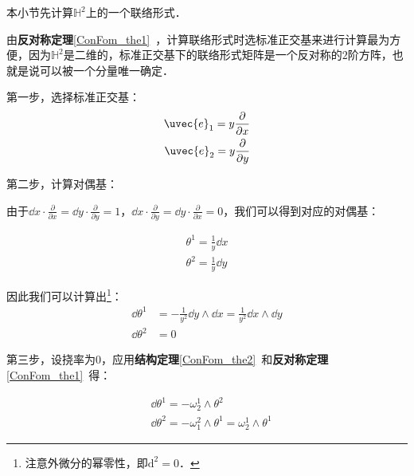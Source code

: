 
本小节先计算$\mathbb{H}^2$上的一个联络形式．

由\textbf{反对称定理}\autoref{ConFom_the1}~，计算联络形式时选标准正交基来进行计算最为方便，因为$\mathbb{H}^2$是二维的，标准正交基下的联络形式矩阵是一个反对称的$2$阶方阵，也就是说可以被一个分量唯一确定．

第一步，选择标准正交基：
\begin{equation}
\begin{aligned}
\uvec{e}_1=y\frac{\partial}{\partial x}\\
\uvec{e}_2=y\frac{\partial}{\partial y}
\end{aligned}
\end{equation}

第二步，计算对偶基：

由于$\dd x\cdot \frac{\partial }{\partial x}=\dd y\cdot \frac{\partial}{\partial y}=1$，$\dd x\cdot \frac{\partial }{\partial y}=\dd y\cdot \frac{\partial}{\partial x}=0$，我们可以得到对应的对偶基：

\begin{equation}\label{PoiHP_eq1}
\begin{aligned}
\theta^1=\frac{1}{y}\dd x\\
\theta^2=\frac{1}{y}\dd y
\end{aligned}
\end{equation}

因此我们可以计算出\footnote{注意外微分的幂零性，即$\mathrm{d}^2=0$．}：
\begin{equation}\label{PoiHP_eq2}
\begin{aligned}
\dd\theta^1&=-\frac{1}{y^2}\dd y\wedge\dd x=\frac{1}{y^2}\dd x\wedge \dd y\\
\dd\theta^2&=0
\end{aligned}
\end{equation}

第三步，设挠率为$0$，应用\textbf{结构定理}\autoref{ConFom_the2}~和\textbf{反对称定理}\autoref{ConFom_the1}~得：

\begin{equation}\label{PoiHP_eq3}
\begin{aligned}
&\dd\theta^1=-\omega^1_2\wedge\theta^2\\
&\dd\theta^2=-\omega^2_1\wedge\theta^1=\omega^1_2\wedge\theta^1
\end{aligned}
\end{equation}



